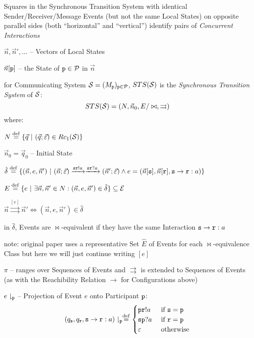 Squares in the Synchronous Transition System with identical
Sender/Receiver/Message Events (but not the same Local States) on
opposite parallel sides (both ``horizontal'' and ``vertical'')
identify pairs of \emph{Concurrent Interactions}

$\vec{n}, \vec{n}', \ldots$ -- Vectors of Local States

$\vec{n}[\mathtt{p}]$ -- the State of $\mathtt{p} \in \mathcal{P}$ in
$\vec{n}$

for Communicating System $\mathcal{S} =
(M_\mathtt{p})_{\mathtt{p}\in\mathcal{P}}$, $STS(\mathcal{S})$ is the
\emph{Synchronous Transition System} of $\mathcal{S}$:
\[
  STS(\mathcal{S}) = (N,\vec{n}_0,E/\bowtie,\rightrightarrows)
\]
where:

$N \defeq \{ \vec{q} \ |\ (\vec{q};\vec{\varepsilon}) \in Rc_1(\class{S}) \}$

$\vec{n}_0 = \vec{q}_0$ -- Initial State

$\hat{\delta} \stackrel{\mathrm{def}}= \{ (\vec{n},e,\vec{n}')
\ |\ (\vec{n};\vec{\varepsilon})
    \xrightarrow{\mathtt{sr}!a} \xrightarrow{\mathtt{sr}?a}
     (\vec{n}';\vec{\varepsilon}) \wedge
    e = (\vec{n}[\mathtt{s}],\vec{n}[\mathtt{r}],
      \mathtt{s}\rightarrow\mathtt{r}:a)
\}$

$E \stackrel{\mathrm{def}}= \{ e \ |\ \exists\vec{n},\vec{n}' \in N :
  (\vec{n},e,\vec{n}') \in \hat{\delta} \} \subseteq \mathcal{E}$

$\vec{n} \stackrel{[e]}{\rightrightarrows} \vec{n}' \Leftrightarrow
  (\vec{n},e,\vec{n}') \in \hat{\delta}$

in $\hat{\delta}$, Events are $\bowtie$-equivalent if they have the
same Interaction $\mathtt{s}\rightarrow\mathtt{r} : a$

note: original paper uses a representative Set $\hat{E}$ of Events for
each $\bowtie$-equivalence Class but here we will just continue
writing $[e]$

$\pi$ -- ranges over Sequences of Events and $\rightrightarrows$ is
extended to Sequences of Events (as with the Reachibility Relation
$\rightarrow$ for Configurations above)

$e\downharpoonright_\mathtt{p}$ -- Projection of Event $e$ onto
Participant $\mathtt{p}$:
\[
  (q_\mathtt{s},q_\mathtt{r},\mathtt{s}\rightarrow\mathtt{r}:a)
    \downharpoonright_\mathtt{p}
  \stackrel{\mathrm{def}}= \begin{cases}
    \mathtt{pr}!a &\ \text{if}\ \mathtt{s = p} \\
    \mathtt{sp}?a &\ \text{if}\ \mathtt{r = p} \\
    \varepsilon  &\ \text{otherwise} \\
  \end{cases}
\]

